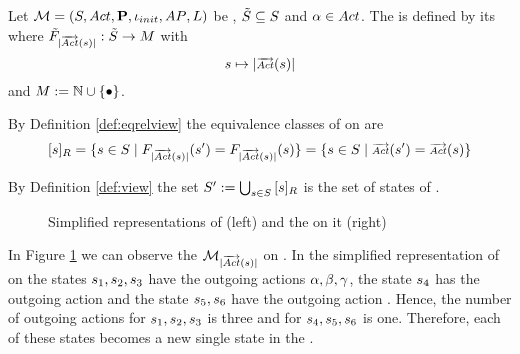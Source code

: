 \documentclass[preview]{standalone}
\begin{document}
\begin{definition}
	Let ${{{\mathcal{M}}}} = {{({S}, {Act}, {\textbf{P}}, {\iota_{init}}, {AP}, {L})}}$ be \achgphN, ${\tilde{{S}}} \subseteq {S}$ and ${\alpha} \in {Act}$. The \viewN \viewoutactsetsize is defined by its \grpfctN \gfctoutactsetsize where $\gfctsuboutactsetsize : \smstates \to \imggrp$ with
	\[
	\state \mapsto |\outacts(\state)|
	\]
	and $\imggrp := \natnums \cup \remset$.
\end{definition}


\noindent By Definition \ref{def:eqrelview} the equivalence classes of \eqrelview on \states are 
\begin{align*}
	\eqclassv[\state] = \{ \state \in \states \mid \gfctoutactsetsize(\state') = \gfctoutactsetsize(\state)\} = \{ \state \in \states \mid \outacts(\state') = \outacts(\state)\}
\end{align*}

\noindent By Definition \ref{def:view} the set ${S}' := \bigcup_{{s} \in {S}} {{[{s}]_{{R}}}}$ is the set of states of \viewweakoutactident.

\begin{figure}[!htb]
	\begin{minipage}{.5\textwidth}
		\hspace{5mm}
		
	\end{minipage}%
	\begin{minipage}{.5\textwidth}						
		\centering
		
	\end{minipage}	
	\caption{Simplified representations of \mdp (left) and the \viewN \viewoutactsetsize on it (right)}	
	\label{fig:outActSetSize} 	
\end{figure}

\begin{exmp}
	In Figure \ref{fig:outActSetSize} we can observe the \viewN $\viewoutactsetsize$ on \chgph. In the simplified representation of \achgphN on the states ${s}_1, {s}_2, {s}_3$ have the outgoing actions ${\alpha}, {\beta}, {\gamma}$, the state ${s}_4$ has the outgoing action \action and the state ${s}_5, {s}_6$ have the outgoing action \actionc. Hence, the number of outgoing actions for ${s}_1, {s}_2, {s}_3$ is three and for ${s}_4, {s}_5, {s}_6$ is one. Therefore, each of these states becomes a new single state in the \viewN \viewoutactsetsize.
\end{exmp}
\end{document}
